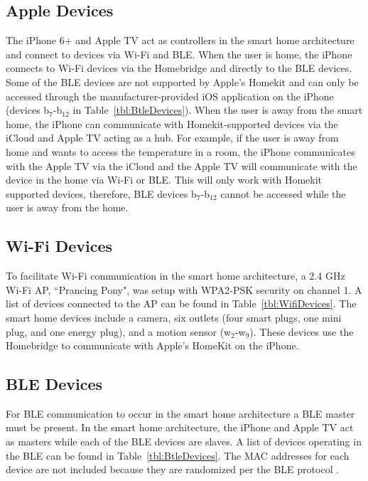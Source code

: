 \documentclass[12pt,letterpaper,oneside]{book}
\begin{document}
\subsection{Apple Devices}

The iPhone 6+ and Apple TV act as controllers in the smart home architecture and connect to devices via Wi-Fi and \ac{BLE}. When the user is home, the iPhone connects to Wi-Fi devices via the Homebridge and directly to the \ac{BLE} devices. Some of the \ac{BLE} devices are not supported by Apple's Homekit and can only be accessed through the manufacturer-provided iOS application on the iPhone (devices b$ _7 $-b$ _{12} $ in Table~\ref{tbl:BtleDevices}). When the user is away from the smart home, the iPhone can communicate with Homekit-supported devices via the iCloud and Apple TV acting as a hub. For example, if the user is away from home and wants to access the temperature in a room, the iPhone communicates with the Apple TV via the iCloud and the Apple TV will communicate with the device in the home via Wi-Fi or \ac{BLE}. This will only work with Homekit supported devices, therefore, \ac{BLE} devices b$ _7 $-b$ _{12} $ cannot be accessed while the user is away from the home. 

\subsection{Wi-Fi Devices}

To facilitate Wi-Fi communication in the smart home architecture, a 2.4 GHz Wi-Fi \ac{AP}, ``Prancing Pony", was setup with \ac{WPA2-PSK} security on channel 1. A list of devices connected to the \ac{AP} can be found in Table~\ref{tbl:WifiDevices}. The smart home devices include a camera, six outlets (four smart plugs, one mini plug, and one energy plug), and a motion sensor (w$ _2 $-w$ _9 $). These devices use the Homebridge to communicate with Apple's HomeKit on the iPhone. 

\tableWifiDevices

\subsection{\acf{BLE} Devices}

For \ac{BLE} communication to occur in the smart home architecture a \ac{BLE} master must be present. In the smart home architecture, the iPhone and Apple TV act as masters while each of the \ac{BLE} devices are slaves. A list of devices operating in the \ac{BLE} can be found in Table~\ref{tbl:BtleDevices}. The \ac{MAC} addresses for each device are not included because they are randomized per the \ac{BLE} protocol \cite{sig4.2}.
\end{document}
